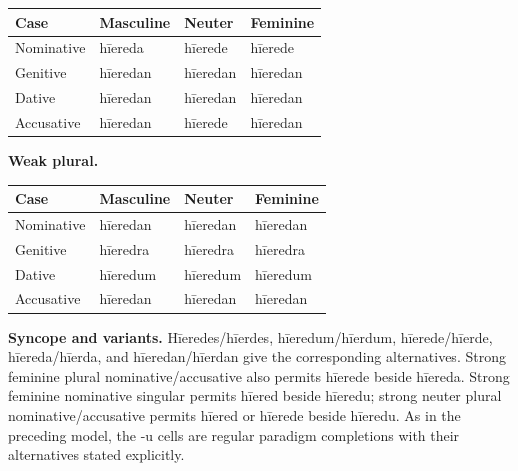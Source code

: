 \par\begingroup
\fontsize{10.5}{13.2}\selectfont
\setlength{\LTleft}{0pt}\setlength{\LTright}{\fill}
\noindent
\begin{tabular}{@{}>{\raggedright\arraybackslash}p{22.0mm}>{\raggedright\arraybackslash}p{31.188mm}>{\raggedright\arraybackslash}p{31.188mm}>{\raggedright\arraybackslash}p{31.188mm}@{}}
\toprule
\textbf{Case} & \textbf{Masculine} & \textbf{Neuter} & \textbf{Feminine} \\
\midrule
Nominative & hīereda & hīerede & hīerede \\
Genitive & hīeredan & hīeredan & hīeredan \\
Dative & hīeredan & hīeredan & hīeredan \\
Accusative & hīeredan & hīerede & hīeredan \\
\bottomrule
\end{tabular}
\par\endgroup
\textbf{Weak plural.}

\par\begingroup
\fontsize{10.5}{13.2}\selectfont
\setlength{\LTleft}{0pt}\setlength{\LTright}{\fill}
\noindent
\begin{tabular}{@{}>{\raggedright\arraybackslash}p{22.0mm}>{\raggedright\arraybackslash}p{31.188mm}>{\raggedright\arraybackslash}p{31.188mm}>{\raggedright\arraybackslash}p{31.188mm}@{}}
\toprule
\textbf{Case} & \textbf{Masculine} & \textbf{Neuter} & \textbf{Feminine} \\
\midrule
Nominative & hīeredan & hīeredan & hīeredan \\
Genitive & hīeredra & hīeredra & hīeredra \\
Dative & hīeredum & hīeredum & hīeredum \\
Accusative & hīeredan & hīeredan & hīeredan \\
\bottomrule
\end{tabular}
\par\endgroup
\textbf{Syncope and variants.} Hīeredes/\allowbreak{}hīerdes, hīeredum/\allowbreak{}hīerdum, hīerede/\allowbreak{}hīerde, hīereda/\allowbreak{}hīerda, and hīeredan/\allowbreak{}hīerdan give the corresponding alternatives. Strong feminine plural nominative/\allowbreak{}accusative also permits hīerede beside hīereda. Strong feminine nominative singular permits hīered beside hīeredu; strong neuter plural nominative/\allowbreak{}accusative permits hīered or hīerede beside hīeredu. As in the preceding model, the -u cells are regular paradigm completions with their alternatives stated explicitly.

